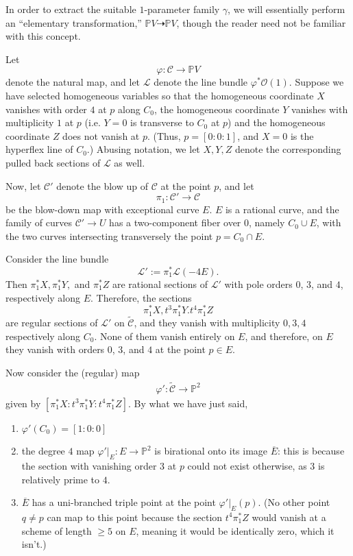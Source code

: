 \documentclass[12 pt, reqno]{amsart}
\theoremstyle{definition}
\newcommand{\mb}{\mathbb}
\renewcommand{\P}{\mb{P}}
\begin{document}
In order to extract the suitable $1$-parameter family $\gamma$, we
will essentially perform an ``elementary transformation,''
$\P V \dashrightarrow \P V$, though the reader need not be familiar
with this concept.  

Let
\[\varphi: \mathcal{C} \to \P V\] denote the natural map, and let
$\mathcal{L}$ denote the line bundle $\varphi^{*}\mathcal{O}(1)$.
Suppose we have selected homogeneous variables so that the homogeneous
coordinate $X$ vanishes with order $4$ at $p$ along $C_{0}$, the
homogeneous coordinate $Y$ vanishes with multiplicity $1$ at $p$
(i.e. $Y=0$ is transverse to $C_{0}$ at $p$) and the homogeneous
coordinate $Z$ does not vanish at $p$. (Thus, $p = [0:0:1]$, and $X=0$
is the hyperflex line of $C_0$.) Abusing notation, we let $X, Y, Z$
denote the corresponding pulled back sections of $\mathcal{L}$ as
well.

Now, let $\mathcal{C}'$ denote the blow up of $\mathcal{C}$ at the
point $p$, and let \[\pi_{1}:\mathcal{C}' \to \mathcal{C}\] be the
blow-down map with exceptional curve $E$.  $E$ is a rational curve,
and the family of curves $\mathcal{C}' \to U$ has a two-component
fiber over $0$, namely $C_{0} \cup E$, with the two curves
intersecting transversely the point $p = C_{0} \cap E$.

Consider the line bundle
\[\mathcal{L}' := \pi_{1}^{*}\mathcal{L}(-4E).\]
Then $\pi_{1}^{*}X, \pi_{1}^{*}Y,$ and $\pi_{1}^{*}Z$ are rational
sections of $\mathcal{L}'$ with pole orders $0$, $3$, and $4$,
respectively along $E$.  Therefore, the sections
\[\pi_{1}^{*}X, t^{3}\pi_{1}^{*}Y. t^{4}\pi_{1}^{*}Z\] are regular
sections of $\mathcal{L}'$ on $\widetilde{\mathcal{C}}$, and they
vanish with multiplicity $0, 3, 4$ respectively along $C_{0}$. None of
them vanish entirely on $E$, and therefore, on $E$ they vanish with
orders $0$, $3$, and $4$ at the point $p \in E$.

Now consider the (regular) map
\begin{align}
  \label{newmap}
  \varphi': \widetilde{\mathcal{C}} \to \P^{2}
  \end{align}
  given by $[\pi_{1}^{*}X: t^{3}\pi_{1}^{*}Y: t^{4}\pi_{1}^{*}Z]$.  By
  what we have just said,
\begin{enumerate}
\item $\varphi'(C_0) = [1:0:0]$
\item the degree $4$ map $\varphi'|_{E}: E \to \P^{2}$ is birational
  onto its image $\overline{E}$: this is because the section with
  vanishing order $3$ at $p$ could not exist otherwise, as $3$ is
  relatively prime to $4$.
\item $\overline{E}$ has a uni-branched triple point at the point
  $ \varphi'|_{E}(p)$. (No other point $q \neq p$ can map to this
  point because the section $t^{4}\pi_{1}^{*}Z$ would vanish at a
  scheme of length $\geq 5$ on $E$, meaning it would be identically
  zero, which it isn't.)
\end{enumerate}
\end{document}

